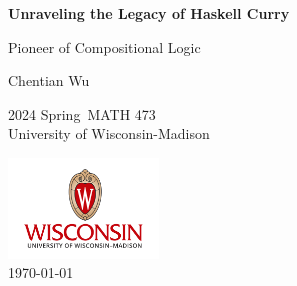 
\begin{titlepage}
    \begin{center}
        \vspace*{2.7cm}
            
        \Huge
        \textbf{Unraveling the Legacy of Haskell Curry}
            
        \vspace{1cm}
        \huge
        Pioneer of Compositional Logic
        \vspace{1.5cm}
        \Large
            
        Chentian Wu\vfill

        2024 Spring\ MATH 473\\
        University of Wisconsin-Madison\\
        \vspace{1cm}  
    
        \includegraphics[width=0.3\textwidth]{templates/logo-wisc.png}\\
        \vspace{1cm}  
        \Large \today
        
    \end{center}
\end{titlepage}
